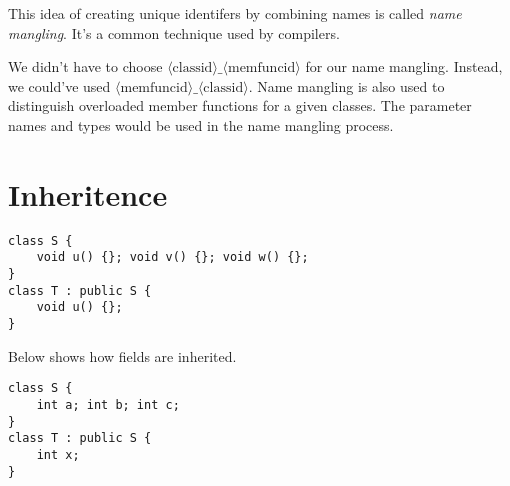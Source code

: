 This idea of creating unique identifers by combining names is 
called \textit{name mangling}. It's a common technique used by compilers. 


We didn't have to choose 
$\langle \text{classid} \rangle \_ \langle \text{memfuncid} \rangle$
for our name mangling. Instead, we could've used 
$\langle \text{memfuncid} \rangle \_ \langle \text{classid} \rangle$.
Name mangling is also used to distinguish overloaded member functions 
for a given classes. The parameter names and types would be used in the 
name mangling process.


\section{Inheritence}





\begin{lstlisting}
class S {
	void u() {}; void v() {}; void w() {};
}
class T : public S {
	void u() {};
}
\end{lstlisting}


\begin{figure}[h]
\end{figure} 


Below shows how fields are inherited.

\begin{lstlisting}
class S {
	int a; int b; int c;
}
class T : public S {
	int x;
}
\end{lstlisting}


